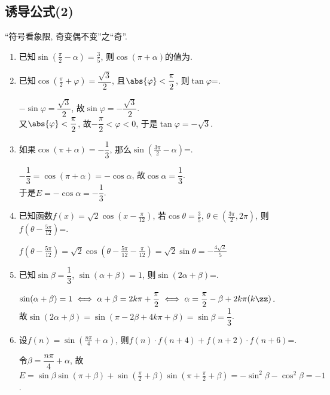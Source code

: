\subsection{诱导公式(2)}
\zsd ``符号看象限, 奇变偶不变''之``奇''.

\begin{enumerate}
\item 已知$\sin(\frac{\pi}{2}-\alpha)=\frac{3}{5}$, 则$\cos(\pi+\alpha)$的值为. 

\item 已知$\cos(\frac{\pi}{2}+\varphi)=\dfrac{\sqrt3}{2}$, 且$\abs{\varphi}<\dfrac{\pi}{2}$, 则$\tan\varphi$=. 
\begin{jieda}
$-\sin\varphi=\dfrac{\sqrt{3}}{2}$, 故$\sin\varphi=-\dfrac{\sqrt{3}}{2}$. \\
又$\abs{\varphi}<\dfrac{\pi}{2}$, 故$-\dfrac{\pi}{2}<\varphi<0$, 于是$\tan\varphi=-\sqrt{3}$. 
\end{jieda}

\item 如果$\cos(\pi+\alpha)=-\dfrac{1}{3}$, 那么$\sin\left(\frac{3\pi}{2}-\alpha\right)$=. 
\begin{jieda}
$-\dfrac{1}{3}=\cos(\pi+\alpha)=-\cos\alpha$, 故$\cos\alpha=\dfrac{1}{3}$. \\
于是$E=-\cos\alpha=-\dfrac{1}{3}$. 
\end{jieda}

\item 已知函数$f(x)=\sqrt2\cos(x-\frac{\pi}{12})$, 若$\cos\theta=\frac{3}{5}$, $\theta\in(\frac{3\pi}{2},2\pi)$, 
则$f(\theta-\frac{5\pi}{12})$=. 
\begin{jieda}
$f(\theta-\frac{5\pi}{12})=\sqrt2\cos(\theta-\frac{5\pi}{12}-\frac{\pi}{12})=\sqrt{2}\sin\theta=-\frac{4\sqrt{2}}{5}$
\end{jieda}


\item 已知$\sin\beta=\dfrac{1}{3}$, $\sin(\alpha+\beta)=1$, 则$\sin(2\alpha+\beta)$=. 
\begin{jieda}
$\sin(\alpha+\beta)=1\iff\alpha+\beta=2k\pi+\dfrac{\pi}{2}\iff\alpha=\dfrac{\pi}{2}-\beta+2k\pi(k\zz)$. \\
故$\sin(2\alpha+\beta)=\sin(\pi-2\beta+4k\pi+\beta)=\sin\beta=\dfrac{1}{3}$. 
\end{jieda}


\item 设$f(n)=\sin\left(\frac{n\pi}{4}+\alpha\right)$, 则$f(n)\cdot f(n+4)+f(n+2)\cdot f(n+6)$=. 
\begin{jieda}
令$\beta=\dfrac{n\pi}{4}+\alpha$, 故$E=\sin\beta\sin(\pi+\beta)+\sin(\frac{\pi}{2}+\beta)\sin(\pi+\frac{\pi}{2}+\beta)=-\sin^2\beta-\cos^2\beta=-1$. 
\end{jieda}


\end{enumerate}
